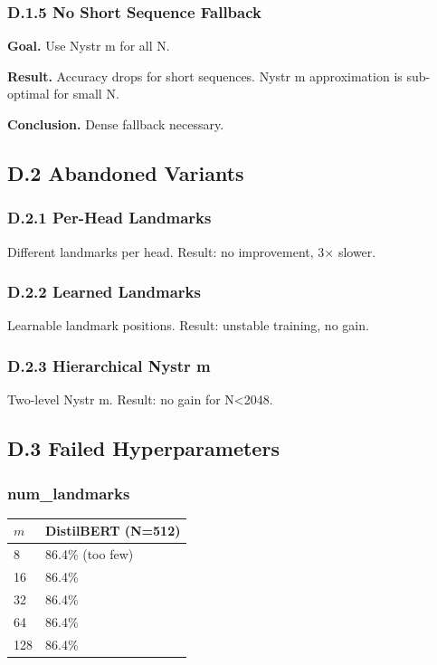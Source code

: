\subsubsection{D.1.5 No Short Sequence Fallback}

\textbf{Goal.} Use Nystr m for all N.

\textbf{Result.} Accuracy drops for short sequences. Nystr m approximation is 
sub-optimal for small N.

\textbf{Conclusion.} Dense fallback necessary.

\subsection{D.2 Abandoned Variants}

\subsubsection{D.2.1 Per-Head Landmarks}

Different landmarks per head. Result: no improvement, 3$\times$ slower.

\subsubsection{D.2.2 Learned Landmarks}

Learnable landmark positions. Result: unstable training, no gain.

\subsubsection{D.2.3 Hierarchical Nystr m}

Two-level Nystr m. Result: no gain for N\textless{}2048.

\subsection{D.3 Failed Hyperparameters}

\subsubsection{num\_landmarks}

\begin{table}[H]
\centering
\small
\begin{tabular}{ll}
\toprule
\textbf{$m$} & \textbf{DistilBERT (N=512)} \\
\midrule
8 & 86.4\% (too few) \\
16 & 86.4\% \\
32 & 86.4\% \\
64 & 86.4\% \\
128 & 86.4\% \\
\bottomrule
\end{tabular}
\end{table}

